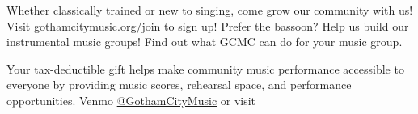 \documentclass{article}[10pt]
\begin{document}
\begin{center}
\begin{minipage}{4.2in}
            \begin{center}
            {\textbf{}}
            \end{center}

            \vspace{-0.1in}

            \begin{small}
                Whether classically trained or new to singing, come grow our community with us!
                Visit {\href{gothamcitymusic.org/join}{gothamcitymusic.org/join}} to sign up!
                Prefer the bassoon?
                Help us build our instrumental music groups!
                Find out what GCMC can do for your music group.
            \end{small}

            \begin{center}
            {\textbf{}}
            \end{center}

            \vspace{-0.1in}

            \begin{small}
                Your tax-deductible gift helps make community music performance accessible to everyone by providing music scores, rehearsal space, and performance opportunities.
                Venmo \href{https://account.venmo.com/u/GothamCityMusic}{@GothamCityMusic} or visit \textbf{}
            \end{small}


            \begin{center}
            {\textbf{}}
                \\


\end{center}
\end{minipage}
\end{center}
\end{document}

